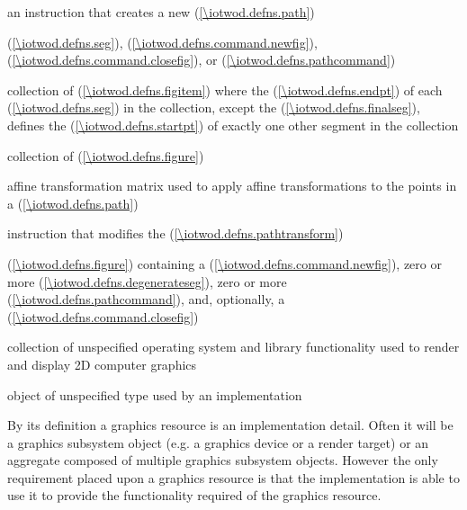 %
 an instruction that creates a new  (\ref{\iotwod.defns.path})

%
 (\ref{\iotwod.defns.seg}),  (\ref{\iotwod.defns.command.newfig}),  (\ref{\iotwod.defns.command.closefig}), or  (\ref{\iotwod.defns.pathcommand})

%
collection of  (\ref{\iotwod.defns.figitem}) where the  (\ref{\iotwod.defns.endpt}) of each  (\ref{\iotwod.defns.seg}) in the collection, except the  (\ref{\iotwod.defns.finalseg}), defines the  (\ref{\iotwod.defns.startpt}) of exactly one other segment in the collection

%
collection of  (\ref{\iotwod.defns.figure})

%
affine transformation matrix used to apply affine transformations to the points in a  (\ref{\iotwod.defns.path})

%
instruction that modifies the  (\ref{\iotwod.defns.pathtransform})

%
 (\ref{\iotwod.defns.figure}) containing a  (\ref{\iotwod.defns.command.newfig}), zero or more  (\ref{\iotwod.defns.degenerateseg}), zero or more  (\ref{\iotwod.defns.pathcommand}), and, optionally, a  (\ref{\iotwod.defns.command.closefig})

%
collection of unspecified operating system and library functionality used to render and display 2D computer graphics

%
 object of unspecified type used by an implementation
\begin{note}
By its definition a graphics resource is an implementation detail. Often it will be a graphics subsystem object (e.g. a graphics device or a render target) or an aggregate composed of multiple graphics subsystem objects. However the only requirement placed upon a graphics resource is that the implementation is able to use it to provide the functionality required of the graphics resource.
\end{note}

